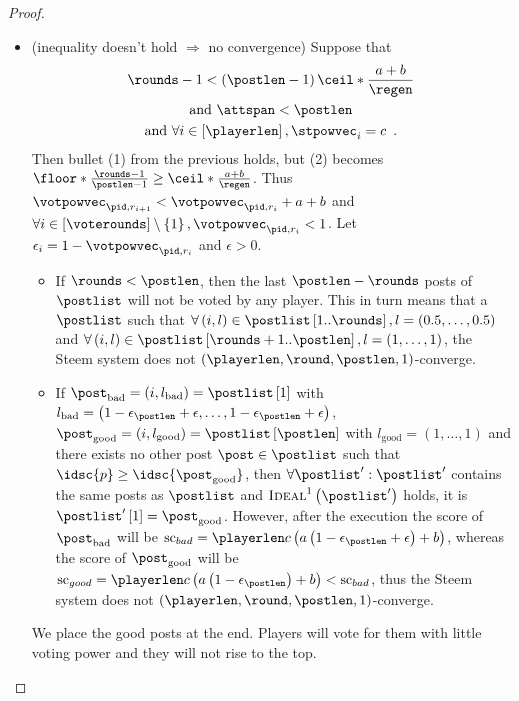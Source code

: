 \begin{proof}
\begin{itemize}
    \item (inequality doesn't hold $\Rightarrow$ no convergence) Suppose that
    \begin{gather}
      \label{conv:proof:fewrounds}
      \rounds - 1 < \left(\postlen - 1\right)\ceil*{\frac{a+b}{\regen}} \\
      \label{conv:proof:lowattspan}
      \text{and } \attspan < \postlen \\
      \text{and } \forall i \in \left[\playerlen\right], \stpowvec_i = c
      \enspace. \nonumber
    \end{gather}
 Then bullet (1) from the
    previous holds, but (2) becomes $\floor*{\frac{\rounds - 1}{\postlen - 1}}
    \geq \ceil*{\frac{a+b}{\regen}}$. Thus $\votpowvec_{\pid, r_{i + 1}} <
    \votpowvec_{\pid, r_i} + a + b$ and $\forall i \in \left[\voterounds\right]
    \setminus \left\{1\right\}, \votpowvec_{\pid, r_i} < 1$. Let $\epsilon_i = 1
    - \votpowvec_{\pid, r_i}$ and $\epsilon > 0$.

    \begin{itemize}
      \item If $\rounds < \postlen$, then the last $\postlen - \rounds$ posts of
      $\postlist$ will not be voted by any player. This in turn means that a
      $\postlist$ such that $\forall \left(i, l\right) \in
      \postlist\left[1..\rounds\right], l = \left(0.5, \dots, 0.5\right)$ and
      $\forall \left(i, l\right) \in \postlist\left[\rounds +
      1..\postlen\right], l = \left(1, \dots, 1\right)$, the Steem system does
      not $\left(\playerlen, \round, \postlen, 1\right)$-converge.

      \item If $\post_\mathrm{bad} = \left(i, l_\mathrm{bad}\right) =
      \postlist\left[1\right]$ with $l_\mathrm{bad} = \left(1 -
      \epsilon_\postlen + \epsilon, \dots, 1 - \epsilon_\postlen +
      \epsilon\right)$, $\post_\mathrm{good} = \left(i, l_\mathrm{good}\right) =
      \postlist\left[\postlen\right]$ with $l_\mathrm{good} = \left(1, \dots,
      1\right)$ and there exists no other post $\post \in \postlist$ such that
      $\idsc{p} \geq \idsc{\post_\mathrm{good}}$, then $\forall \postlist':
      \postlist'$ contains the same posts as $\postlist$ and
      $\textsc{Ideal}^1\left(\postlist'\right)$ holds, it is
      $\postlist'\left[1\right] = \post_\mathrm{good}$. However, after the
      execution the score of $\post_\mathrm{bad}$ will be $\mathrm{sc}_{bad} =
      \playerlen c \left(a \left(1 - \epsilon_\postlen + \epsilon\right) +
      b\right)$, whereas the score of $\post_\mathrm{good}$ will be
      $\mathrm{sc}_{good} = \playerlen c \left(a \left(1 -
      \epsilon_\postlen\right) + b\right) < \mathrm{sc}_{bad}$, thus the Steem
      system does not $\left(\playerlen, \round, \postlen, 1\right)$-converge.
    \end{itemize}
    We place the
    good posts at the end. Players will vote for them with little voting power
    and they will not rise to the top.
  \end{itemize}
\end{proof}
